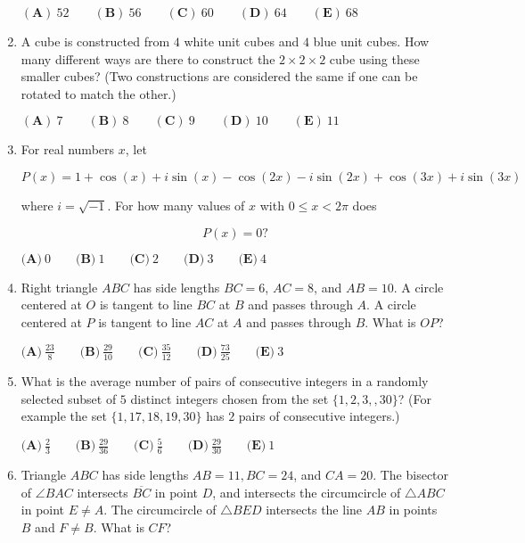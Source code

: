 \documentclass{article}
\begin{document}
\begin{enumerate}[label=\arabic*., itemsep=0.5em]
$(\textbf{A})\: 52\qquad(\textbf{B}) \: 56\qquad(\textbf{C}) \: 60\qquad(\textbf{D}) \: 64\qquad(\textbf{E}) \: 68$\par \vspace{0.5em}\item A cube is constructed from $4$ white unit cubes and $4$ blue unit cubes. How many different ways are there to construct the $2 \times 2 \times 2$ cube using these smaller cubes? (Two constructions are considered the same if one can be rotated to match the other.)

$(\textbf{A})\: 7\qquad(\textbf{B}) \: 8\qquad(\textbf{C}) \: 9\qquad(\textbf{D}) \: 10\qquad(\textbf{E}) \: 11$\par \vspace{0.5em}\item For real numbers $x$, let 

\begin{equation*}
P(x)=1+\cos(x)+i\sin(x)-\cos(2x)-i\sin(2x)+\cos(3x)+i\sin(3x)
\end{equation*}

where $i = \sqrt{-1}$. For how many values of $x$ with $0\leq x<2\pi$ does 

\begin{equation*}
P(x)=0?
\end{equation*}


$\textbf{(A)}\ 0 \qquad\textbf{(B)}\  1 \qquad\textbf{(C)}\  2 \qquad\textbf{(D)}\
3 \qquad\textbf{(E)}\ 4$\par \vspace{0.5em}\item Right triangle $ABC$ has side lengths $BC=6$, $AC=8$, and $AB=10$. A circle centered at $O$ is tangent to line $BC$ at $B$ and passes through $A$. A circle centered at $P$ is tangent to line $AC$ at $A$ and passes through $B$. What is $OP$?

$\textbf{(A)}\ \frac{23}{8} \qquad\textbf{(B)}\  \frac{29}{10} \qquad\textbf{(C)}\  \frac{35}{12} \qquad\textbf{(D)}\
\frac{73}{25} \qquad\textbf{(E)}\ 3$\par \vspace{0.5em}\item What is the average number of pairs of consecutive integers in a randomly selected subset of $5$ distinct integers chosen from the set $\{ 1, 2, 3, , 30\}$? (For example the set $\{1, 17, 18, 19, 30\}$ has $2$ pairs of consecutive integers.)

$\textbf{(A)}\ \frac{2}{3} \qquad\textbf{(B)}\ \frac{29}{36} \qquad\textbf{(C)}\ \frac{5}{6} \qquad\textbf{(D)}\
\frac{29}{30} \qquad\textbf{(E)}\ 1$\par \vspace{0.5em}\item Triangle $ABC$ has side lengths $AB = 11, BC=24$, and $CA = 20$. The bisector of $\angle{BAC}$ intersects $\overline{BC}$ in point $D$, and intersects the circumcircle of $\triangle{ABC}$ in point $E \ne A$. The circumcircle of $\triangle{BED}$ intersects the line $AB$ in points $B$ and $F \ne B$. What is $CF$?


\end{enumerate}
\end{document}
